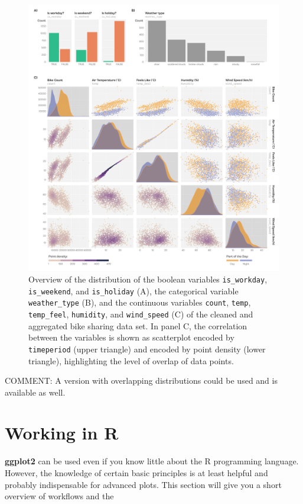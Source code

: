 \documentclass[
]{krantz}
\begin{document}
\begin{figure}
\centering
\includegraphics{./img/setup-data-comparison-all-dodge.png}
\caption{\label{fig:img-data-overview-vars}Overview of the distribution of the boolean variables \texttt{is\_workday}, \texttt{is\_weekend}, and \texttt{is\_holiday} (A), the categorical variable \texttt{weather\_type} (B), and the continuous variables \texttt{count}, \texttt{temp}, \texttt{temp\_feel}, \texttt{humidity}, and \texttt{wind\_speed} (C) of the cleaned and aggregated bike sharing data set. In panel C, the correlation between the variables is shown as scatterplot encoded by \texttt{timeperiod} (upper triangle) and encoded by point density (lower triangle), highlighting the level of overlap of data points.}
\end{figure}

COMMENT: A version with overlapping distributions could be used and is available as well.

\hypertarget{rstats}{%
\section{Working in R}\label{rstats}}

\textbf{ggplot2} can be used even if you know little about the R programming language. However, the knowledge of certain basic principles is at least helpful and probably indispensable for advanced plots. This section will give you a short overview of workflows and the
\end{document}
